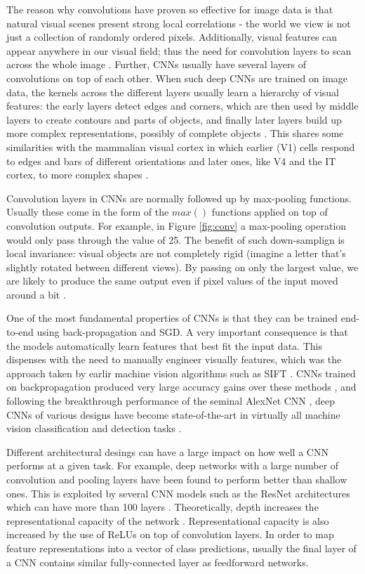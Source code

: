 \documentclass[12pt]{report}
\begin{document}
The reason why convolutions have proven so effective for image data is that natural visual scenes present strong local correlations - the world we view is not just a collection of randomly ordered pixels. Additionally, visual features can appear anywhere in our visual field; thus the need for convolution layers to scan across the whole image \cite{Lecun2015}. Further, CNNs usually have several layers of convolutions on top of each other. When such deep CNNs are trained on image data, the kernels across the different layers usually learn a hierarchy of visual features: the early layers detect edges and corners, which are then used by middle layers to create contours and parts of objects, and finally later layers build up more complex representations, possibly of complete objects \cite{Zeiler2014}. This shares some similarities with the mammalian visual cortex \cite{Cadieu2014} in which earlier (V1) cells respond to edges and bars of different orientations \cite{Hubeld1962} and later ones, like V4 and the IT cortex, to more complex shapes \cite{Kobatake1994}. 

Convolution layers in CNNs are normally followed up by max-pooling functions. Usually these come in the form of the $max()$ functions applied on top of convolution outputs. For example, in Figure \ref{fig:conv} a max-pooling operation would only pass through the value of 25. The benefit of such down-samplign is local invariance: visual objects are not completely rigid (imagine a letter that's slightly rotated between different views). By passing on only the largest value, we are likely to produce the same output even if pixel values of the input moved around a bit \cite{Lecun2015}.

One of the most fundamental properties of CNNs is that they can be trained end-to-end using back-propagation and SGD. A very important consequence is that the models automatically learn features that best fit the input data. This dispenses with the need to manually engineer visually features, which was the approach taken by earlir machine vision algorithms such as SIFT \cite{Lowe1999}. CNNs trained on backpropagation produced very large accuracy gains over these methods \cite{Razavian2014}, and following the breakthrough performance of the seminal AlexNet CNN \cite{Krizhevsky2012}, deep CNNs of various designs have become state-of-the-art in virtually all machine vision classification and detection tasks \cite{JurgenSchmidhuber2015}.

Different architectural desings can have a large impact on how well a CNN performs at a given task. For example, deep networks with a large number of convolution and pooling layers have been found to perform better \cite{Srivastava2015} than shallow ones. This is exploited by several CNN models such as the ResNet architectures which can have more than 100 layers \cite{He2015}. Theoretically, depth increases the representational capacity of the network \cite{Sun2015}. Representational capacity is also increased by the use of ReLUs on top of convolution layers. In order to map feature representations into a vector of class predictions, usually the final layer of a CNN contains similar fully-connected layer as feedforward networks.
\end{document}
